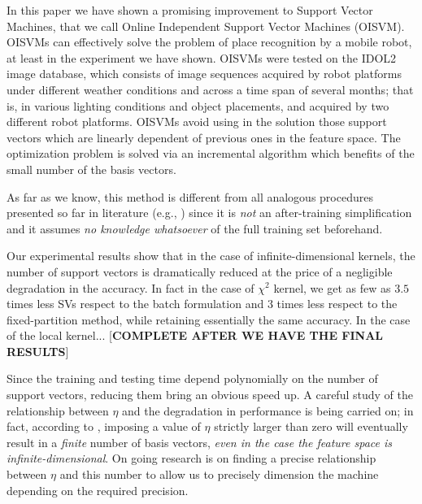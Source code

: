 In this paper we have shown a promising improvement to Support Vector
Machines, that we call Online Independent Support Vector Machines
(OISVM). OISVMs can effectively solve the problem of place recognition
by a mobile robot, at least in the experiment we have shown. OISVMs
were tested on the IDOL2 image database, which consists of image
sequences acquired by robot platforms under different weather
conditions and across a time span of several months; that is, in
various lighting conditions and object placements, and acquired by two
different robot platforms. OISVMs avoid using in the solution those
support vectors which are linearly dependent of previous ones in the
feature space. The optimization problem is solved via an incremental
algorithm which benefits of the small number of the basis vectors.

As far as we know, this method is different from all
analogous procedures presented so far in literature (e.g.,
\cite{DownsGM01,nguyen2005,LeeM01,schoel06,KeerthiCDC06}) since it
is \emph{not} an after-training simplification and it assumes
\emph{no knowledge whatsoever} of the full training set beforehand.

Our experimental results show that in
the case of infinite-dimensional kernels, the number of support vectors
is dramatically reduced at the price of a negligible degradation in
the accuracy. In fact in the case of $\chi^2$ kernel, we get as few
as $3.5$ times less SVs respect to the batch formulation and $3$
times less respect to the fixed-partition method, while retaining
essentially the same accuracy. In the case of the local kernel...
[\textbf{COMPLETE AFTER WE HAVE THE FINAL RESULTS}]

Since the training and testing time depend polynomially on the
number of support vectors, reducing them bring an obvious speed up. A
careful study of the relationship between $\eta$ and the degradation
in performance is being carried on; in fact, according to
\cite{engel2004}, imposing a value of $\eta$ strictly larger than zero
will eventually result in a \emph{finite} number of basis vectors,
\emph{even in the case the feature space is
infinite-dimensional}. On going research is on finding a precise
relationship between $\eta$ and this number to allow
us to precisely dimension the machine depending on the required
precision.
